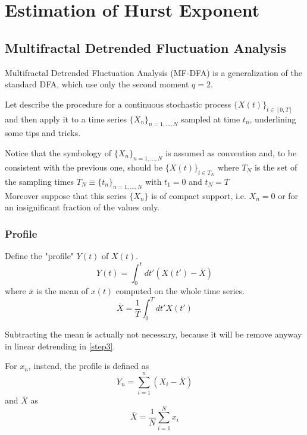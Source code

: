 \section{Estimation of Hurst Exponent}
\subsection{Multifractal Detrended Fluctuation Analysis}
Multifractal Detrended Fluctuation Analysis (MF-DFA) is a generalization of the standard DFA, which use only the second moment $q = 2$. 

Let describe the procedure for a continuous stochastic process $\{X(t)\}_{t\in [0, T]}$ and then apply it to a time series $\{ X_n \}_{n = 1, \dots, N} $ sampled at time $t_n$, underlining some tips and tricks. 

Notice that the symbology of $\{ X_n \}_{n = 1, \dots, N} $ is assumed as convention and, to be consistent with the previous one, should be
$\{ X(t) \}_{t \in T_N}$ where $T_N$ is the set of the sampling times $T_N \equiv \{ t_n\}_{n = 1, \dots, N}$ with $t_1 = 0$ and $t_N = T$ \\
Moreover suppose that this series $\{ X_n \}$ is of compact support, i.e. $X_n = 0$ or for an insignificant fraction of the values only. 

\subsubsection{Profile}\label{step1}
Define the "profile" $Y(t)$ of $X(t)$.
\begin{equation}
	Y( t ) = \int_{0}^{t} dt' (X( t' ) - \bar{X} ) 
\end{equation}
where $\bar{x}$ is the mean of $x(t)$ computed on the whole time series.
\begin{equation}
	\bar{X} = \frac{1}{T} \int_{0}^{T} dt' X( t' )
\end{equation}

Subtracting the mean is actually not necessary, because it will be remove anyway in linear detrending in \autoref{step3}.

For $x_n$, instead, the profile is defined as 
\begin{equation}
	Y_n = \sum_{i=1}^{n} \left( X_i - \bar{X} \right)
\end{equation}
and $\bar{X}$ as 
\begin{equation}
	\bar{X} = \frac{1}{N} \sum_{i=1}^{N} x_i 
\end{equation}

